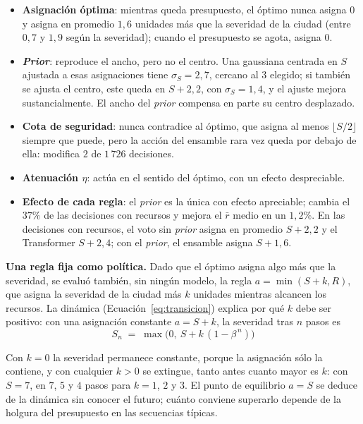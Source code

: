 \documentclass[../00_Main/Main.tex]{subfiles}
\begin{document}
\begin{itemize}
    \item \textbf{Asignaci\'on \'optima}: mientras queda presupuesto, el
    \'optimo nunca asigna $0$ y asigna en promedio $1{,}6$ unidades m\'as
    que la severidad de la ciudad (entre $0{,}7$ y $1{,}9$ seg\'un la
    severidad); cuando el presupuesto se agota, asigna $0$.
    \item \textbf{\emph{Prior}}: reproduce el ancho, pero no el centro. Una
    gaussiana centrada en $S$ ajustada a esas asignaciones tiene
    $\sigma_S = 2{,}7$, cercano al $3$ elegido; si tambi\'en se ajusta el
    centro, este queda en $S + 2{,}2$, con $\sigma_S = 1{,}4$, y el ajuste
    mejora sustancialmente. El ancho del \emph{prior} compensa en parte su
    centro desplazado.
    \item \textbf{Cota de seguridad}: nunca contradice al \'optimo, que
    asigna al menos $\lfloor S/2 \rfloor$ siempre que puede, pero la acci\'on del ensamble rara vez queda por debajo de ella: modifica $2$ de $1\,726$
    decisiones.
    \item \textbf{Atenuaci\'on $\eta$}: act\'ua en el sentido del \'optimo,
    con un efecto despreciable.
    \item \textbf{Efecto de cada regla}: el \emph{prior} es la \'unica con
    efecto apreciable; cambia el $37\%$ de las decisiones con recursos y
    mejora el $\bar r$ medio en un $1{,}2\%$. En las decisiones con recursos, el voto
    sin \emph{prior} asigna en promedio $S + 2{,}2$ y el Transformer
    $S + 2{,}4$; con el \emph{prior}, el ensamble asigna $S + 1{,}6$.
\end{itemize}

\textbf{Una regla fija como pol\'itica.} Dado que el \'optimo asigna algo
m\'as que la severidad, se evalu\'o tambi\'en, sin ning\'un
modelo, la regla $a = \min(S + k, R)$, que asigna la severidad de
la ciudad m\'as $k$ unidades mientras alcancen los recursos. La din\'amica
(Ecuaci\'on~\eqref{eq:transicion}) explica por qu\'e $k$ debe ser
positivo: con una asignaci\'on constante $a = S + k$, la severidad tras
$n$ pasos es
\begin{equation}
S_n \;=\; \max\!\bigl(0,\ S + k\,(1 - \beta^{\,n})\bigr)
\label{eq:rule-dynamics}
\end{equation}

Con $k = 0$ la severidad permanece constante, porque la asignaci\'on s\'olo
la contiene, y con cualquier $k > 0$ se extingue, tanto antes cuanto mayor
es $k$: con $S = 7$, en $7$, $5$ y $4$ pasos para $k = 1$, $2$ y
$3$. El punto de equilibrio $a = S$ se deduce de la din\'amica sin conocer
el futuro; cu\'anto conviene superarlo depende de la holgura del
presupuesto en las secuencias t\'ipicas.
\end{document}
